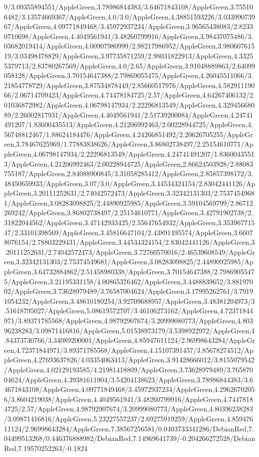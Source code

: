 {\begin{tikzternal}
9/3.09355894551/AppleGreen,3.78986844383/3.64671843108/AppleGreen,3.755106482/3.13574669367/AppleGreen,4.0/3.0/AppleGreen,4.38851593226/3.03399073967/AppleGreen,4.09771849468/3.45972937234/AppleGreen,3.96565438083/2.82330710698/AppleGreen,4.4049561941/3.48260799916/AppleGreen,3.98437075486/3.03682019414/AppleGreen,4.00907980999/2.98217986952/AppleGreen,3.98060761519/3.03498478829/AppleGreen,3.97735871259/2.98031822913/AppleGreen,4.33255379713/2.83780267569/AppleGreen,4.0/2.65/AppleGreen,3.91048889863/2.64099058128/AppleGreen,3.70154647388/2.79869055475/AppleGreen,4.26045511066/3.21854778729/AppleGreen,3.87534878449/2.85660517976/AppleGreen,4.58291119066/2.06714709423/AppleGreen,4.74478184725/2.57/AppleGreen,4.64267406132/2.01036872982/AppleGreen,4.06798147934/2.22296813549/AppleGreen,4.32945668089/2.26002817931/AppleGreen,4.4049561941/2.51739200084/AppleGreen,4.24741491207/1.83600435513/AppleGreen,4.21206992463/2.00228944725/AppleGreen,4.56748812467/1.88624184476/AppleGreen,4.24266851492/2.20626705255/AppleGreen,3.78467625969/1.77883838626/AppleGreen,3.86802738497/2.25154610771/AppleGreen,4.06798147934/2.22296813549/AppleGreen,4.24741491207/1.83600435513/AppleGreen,4.21206992463/2.00228944725/AppleGreen,2.86624503928/2.88083755187/AppleGreen,2.84088900845/3.31058285412/AppleGreen,2.85857398172/3.48450659933/AppleGreen,3.07/3.0/AppleGreen,3.44534324154/2.83042441126/AppleGreen,3.20111252631/2.74042572473/AppleGreen,3.32342131303/2.75374549681/AppleGreen,3.08283098825/2.44890925985/AppleGreen,3.59104569799/2.86712269242/AppleGreen,3.86802738497/2.25154610771/AppleGreen,3.42791902738/2.31822044562/AppleGreen,3.47142933425/2.55647654932/AppleGreen,3.35396771547/2.33101398569/AppleGreen,3.45816647104/2.43891495574/AppleGreen,3.66078076154/2.78803229431/AppleGreen,3.44534324154/2.83042441126/AppleGreen,3.20111252631/2.74042572473/AppleGreen,3.72760570016/2.46539608549/AppleGreen,3.32342131303/2.75374549681/AppleGreen,3.08283098825/2.44890925985/AppleGreen,3.64732884862/2.51458980338/AppleGreen,3.70154647388/2.79869055475/AppleGreen,3.21195331158/4.00865376462/AppleGreen,3.4488839652/3.88197002/AppleGreen,3.73628979489/3.76587004624/AppleGreen,3.17995262761/3.79191054232/AppleGreen,3.48610180254/3.92709688957/AppleGreen,3.48381204973/3.51618795027/AppleGreen,5.08619572707/3.46106273162/AppleGreen,4.72371844971/3.89371785568/AppleGreen,4.98792907674/3.20999080773/AppleGreen,4.80396238283/3.09871416816/AppleGreen,5.01538973179/3.5398922972/AppleGreen,4.84373730766/3.34089200001/AppleGreen,4.85947611124/2.96998643284/AppleGreen,4.72371844971/3.89371785568/AppleGreen,4.15107391457/3.85678274512/AppleGreen,4.27693637826/4.03354063413/AppleGreen,3.91428666012/3.8155079542/AppleGreen,4.02129193585/4.21981418809/AppleGreen,3.73628979489/3.76587004624/AppleGreen,4.39381611904/3.54204138623/AppleGreen,3.78986844383/3.64671843108/AppleGreen,4.09771849468/3.45972937234/AppleGreen,4.29626702056/3.8604219038/AppleGreen,4.4049561941/3.48260799916/AppleGreen,4.74478184725/2.57/AppleGreen,4.98792907674/3.20999080773/AppleGreen,4.80396238283/3.09871416816/AppleGreen,5.23227557237/2.69275919259/AppleGreen,4.85947611124/2.96998643284/AppleGreen,7.38567256581/0.0403733341286/DebianRed,7.04499513268/0.446376888982/DebianRed,7.14969641739/-0.204266272528/DebianRed,7.19570252263/-0.1824
\end{tikzternal}}
